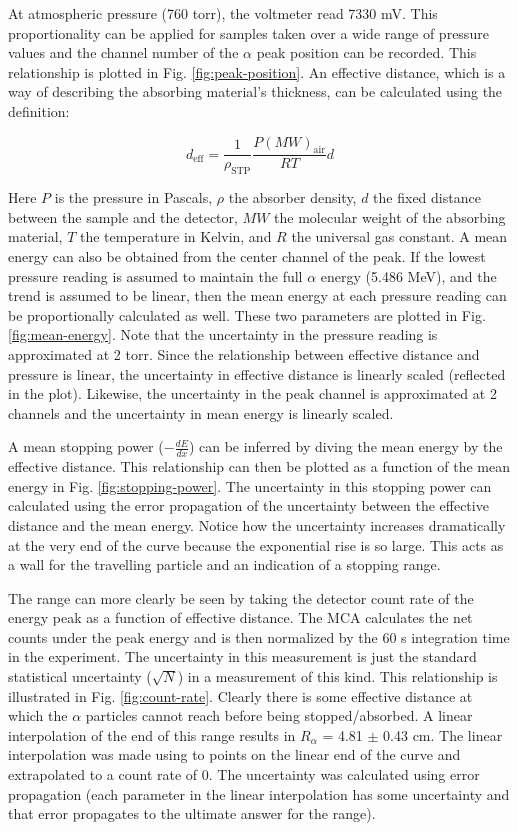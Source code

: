 At atmospheric pressure (760 torr), the voltmeter read 7330 mV. This proportionality can be applied for samples taken over a wide range of pressure values and the channel number of the $\alpha$ peak position can be recorded. This relationship is plotted in Fig. \ref{fig:peak-position}. An effective distance, which is a way of describing the absorbing material’s thickness, can be calculated using the definition:

\begin{equation}
d_{\mathrm{eff}} = \frac{1}{\rho_{\mathrm{STP}}} \frac{P(MW)_{\mathrm{air}}}{RT}d
\end{equation}

Here $P$ is the pressure in Pascals, $\rho$ the absorber density, $d$ the fixed distance between the sample and the detector, $MW$ the molecular weight of the absorbing material, $T$ the temperature in Kelvin, and $R$ the universal gas constant. A mean energy can also be obtained from the center channel of the peak. If the lowest pressure reading is assumed to maintain the full $\alpha$ energy (5.486 MeV), and the trend is assumed to be linear, then the mean energy at each pressure reading can be proportionally calculated as well. These two parameters are plotted in Fig. \ref{fig:mean-energy}. Note that the uncertainty in the pressure reading is approximated at 2 torr. Since the relationship between effective distance and pressure is linear, the uncertainty in effective distance is linearly scaled (reflected in the plot). Likewise, the uncertainty in the peak channel is approximated at 2 channels and the uncertainty in mean energy is linearly scaled.

 A mean stopping power ($-\frac{dE}{dx}$) can be inferred by diving the mean energy by the effective distance. This relationship can then be plotted as a function of the mean energy in Fig. \ref{fig:stopping-power}. The uncertainty in this stopping power can calculated using the error propagation of the uncertainty between the effective distance and the mean energy. Notice how the uncertainty increases dramatically at the very end of the curve because the exponential rise is so large. This acts as a wall for the travelling particle and an indication of a stopping range.

The range can more clearly be seen by taking the detector count rate of the energy peak as a function of effective distance. The MCA calculates the net counts under the peak energy and is then normalized by the 60 s integration time in the experiment. The uncertainty in this measurement is just the standard statistical uncertainty ($\sqrt{N}$) in a measurement of this kind. This relationship is illustrated in Fig. \ref{fig:count-rate}. Clearly there is some effective distance at which the $\alpha$ particles cannot reach before being stopped/absorbed. A linear interpolation of the end of this range results in $R_{\alpha}$ = 4.81 $\pm$ 0.43 cm. The linear interpolation was made using to points on the linear end of the curve and extrapolated to a count rate of 0. The uncertainty was calculated using error propagation (each parameter in the linear interpolation has some uncertainty and that error propagates to the ultimate answer for the range).

